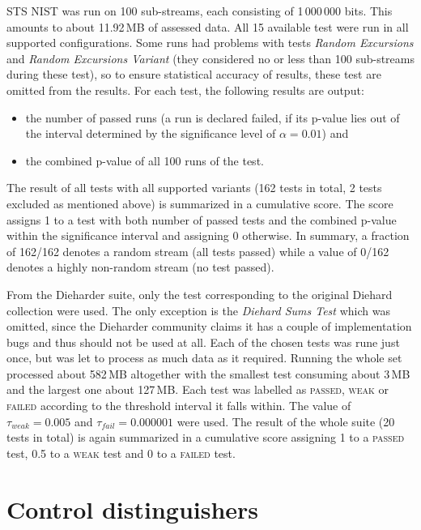 \documentclass[12pt,oneside]{fithesis2}		%
\renewcommand{\_}{\leavevmode \kern0.0em\vbox{\hrule width0.4em}}
\newcommand{\squarebullet}{\textcolor{black}{\raisebox{0.15em}{\rule{4pt}{4pt}}}}
\newenvironment{myItemize}{
  \begin{itemize}[leftmargin=2em,rightmargin=1em,itemsep=\parskip ,parsep=0em,topsep=0em,partopsep=0em]
  \renewcommand{\labelitemi}{\squarebullet}
  \renewcommand{\labelitemii}{$\diamond$}
}{
  \end{itemize}
}
\begin{document}
STS NIST was run on 100 sub-streams, each consisting of 1\,000\,000 bits. This amounts to about 11.92\,MB of assessed data.
All 15 available test were run in all supported configurations. Some runs had problems with tests \textit{Random Excursions} 
and \textit{Random Excursions Variant} (they considered no or less than 100 sub-streams during these test), 
so to ensure statistical accuracy of results, these test are omitted from the results.
For each test, the following results are output:
\begin{myItemize}
\item the number of passed runs (a run is declared failed, if its p-value lies out of the interval determined by the significance
level of $\alpha = 0.01$) and
\item the combined p-value of all 100 runs of the test.
\end{myItemize}
The result of all tests with all supported variants (162 tests in total, 2 tests excluded as mentioned above) 
is summarized in a cumulative score. The score assigns 1 to a test with both number of passed tests and the
combined p-value within the significance interval and assigning 0 otherwise. 
In summary, a fraction of 162/162 denotes a random stream (all tests passed) while a value of 0/162 denotes a highly non-random
stream (no test passed).

From the Dieharder suite, only the test corresponding to the original Diehard collection were used.
The only exception is the \textit{Diehard Sums Test} which was omitted, since the Dieharder community claims it has a couple of
implementation bugs and thus should not be used at all. Each of the chosen tests was rune just once, but was let
to process as much data as it required. Running the whole set processed about 582\,MB altogether with the smallest test
consuming about 3\,MB and the largest one about 127\,MB. Each test was labelled as \textsc{passed}, \textsc{weak} or \textsc{failed}
according to the threshold interval it falls within. The value of $\tau_{weak} = 0.005$ and $\tau_{fail} = 0.000001$ were used.
The result of the whole suite (20 tests in total) is again summarized in a cumulative score assigning 1 to a \textsc{passed} test,
0.5 to a \textsc{weak} test and 0 to a \textsc{failed} test.

\chapter{Control distinguishers}
\label{chap:distinguish-control}
\end{document}
